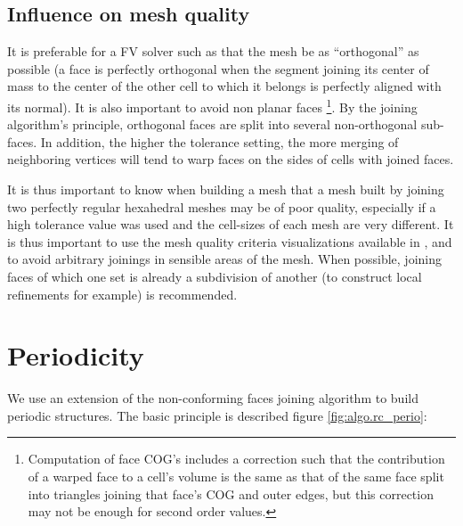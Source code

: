 \subsection*{Influence on mesh quality\label{sec:join.quality}}

It is preferable for a FV solver such as \CS that the mesh be as
``orthogonal'' as possible (a face is perfectly orthogonal when the
segment joining its center of mass to the center of the other cell to
which it belongs is perfectly aligned with its normal).
It is also important to avoid non planar faces
\footnote {Computation of face COG's includes a correction such that
the contribution of a warped face to a cell's volume is the same
as that of the same face split into triangles joining that face's
COG and outer edges, but this correction may not be enough
for second order values.}.
By the joining algorithm's principle, orthogonal faces are split
into several non-orthogonal sub-faces. In addition, the higher
the tolerance setting, the more merging of neighboring vertices
will tend to warp faces on the sides of cells with joined faces.

It is thus important to know when building a mesh that a mesh
built by joining two perfectly regular hexahedral meshes may
be of poor quality, especially if a high tolerance value
was used and the cell-sizes of each mesh are very different.
It is thus important to use the mesh quality criteria visualizations
available in \CS, and to avoid arbitrary joinings in sensible
areas of the mesh. When possible, joining faces of which one
set is already a subdivision of another (to construct local
refinements for example) is recommended.

\section*{Periodicity\label{sec:algo.perio}}

We use an extension of the non-conforming faces joining algorithm
to build periodic structures. The basic principle is described
figure \ref{fig:algo.rc_perio}:


